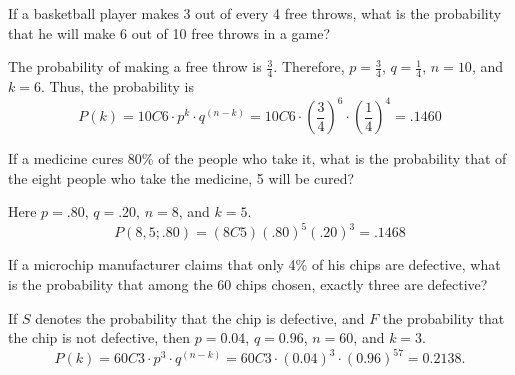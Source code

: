 \begin{example}
    If a basketball player makes 3 out of every 4 free throws, what is the probability that he will make 6 out of 10 free throws in a game?
\end{example}
\begin{solution}
    The probability of making a free throw is \( \frac{3}{4} \). Therefore, \( p = \frac{3}{4} \), \( q = \frac{1}{4} \), \( n = 10 \), and \( k = 6 \). Thus, the probability is
    \[ P(k) = 10C6 \cdot p^k \cdot q^{(n-k)} = 10C6 \cdot \left(\frac{3}{4}\right)^6 \cdot \left(\frac{1}{4}\right)^4 = .1460 \]
\end{solution}

\begin{example}
    If a medicine cures 80\% of the people who take it, what is the probability that of the eight people who take the medicine, 5 will be cured?
\end{example}
\begin{solution}
    Here $p =.80$, $q = .20$, $n = 8$, and $k = 5$.
    \[P(8, 5; .80) = (8C5) (.80)^5(.20)^3 = .1468\]
\end{solution}

\begin{example}
    If a microchip manufacturer claims that only 4\% of his chips are defective, what is the probability that among the 60 chips chosen, exactly three are defective?
\end{example}
\begin{solution}
    If \( S \) denotes the probability that the chip is defective, and \( F \) the probability that the chip is not defective, then \( p = 0.04 \), \( q = 0.96 \), \( n = 60 \), and \( k = 3 \).
    \[ P(k) = 60C3 \cdot p^3 \cdot q^{(n-k)} = 60C3 \cdot (0.04)^3 \cdot (0.96)^{57} = 0.2138. \]
\end{solution}

